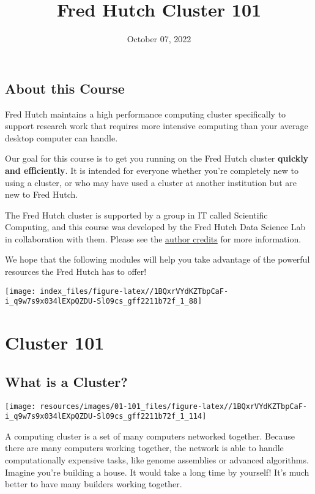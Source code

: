 \documentclass[
]{book}
\title{Fred Hutch Cluster 101}
\author{}
\date{\vspace{-2.5em}October 07, 2022}
\begin{document}
\maketitle

{
\setcounter{tocdepth}{1}
\tableofcontents
}
\hypertarget{about-this-course}{%
\chapter*{About this Course}\label{about-this-course}}

Fred Hutch maintains a high performance computing cluster specifically to support research work that requires more intensive computing than your average desktop computer can handle.

Our goal for this course is to get you running on the Fred Hutch cluster \textbf{quickly and efficiently}. It is intended for everyone whether you're completely new to using a cluster, or who may have used a cluster at another institution but are new to Fred Hutch.

The Fred Hutch cluster is supported by a group in IT called Scientific Computing, and this course was developed by the Fred Hutch Data Science Lab in collaboration with them. Please see the \protect\hyperlink{about-the-authors}{author credits} for more information.

We hope that the following modules will help you take advantage of the powerful resources the Fred Hutch has to offer!

\texttt{[image: index\_files/figure-latex//1BQxrVYdKZTbpCaF-i\_q9w7s9x034lEXpQZDU-Sl09cs\_gff2211b72f\_1\_88]}

\hypertarget{part-cluster-101}{%
\part*{Cluster 101}\label{part-cluster-101}}

\hypertarget{what-is-a-cluster}{%
\chapter{What is a Cluster?}\label{what-is-a-cluster}}

\texttt{[image: resources/images/01-101\_files/figure-latex//1BQxrVYdKZTbpCaF-i\_q9w7s9x034lEXpQZDU-Sl09cs\_gff2211b72f\_1\_114]}

A computing cluster is a set of many computers networked together. Because there are many computers working together, the network is able to handle computationally expensive tasks, like genome assemblies or advanced algorithms. Imagine you're building a house. It would take a long time by yourself! It's much better to have many builders working together.
\end{document}

